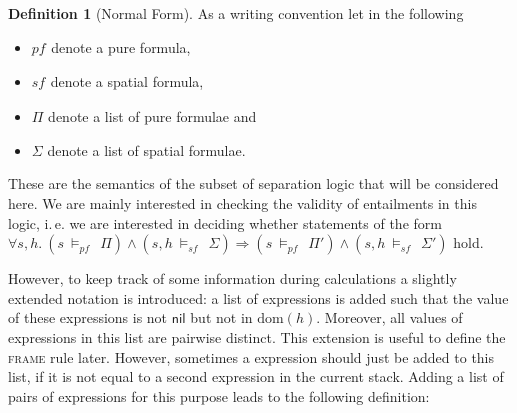 \documentclass{scrartcl}
\theoremstyle{definition}
\newtheorem{definition}{Definition}
\newcommand{\nil}{{\textsf{nil}}}
\newcommand{\modelspf}{{\models_{\textit{pf}}\ }}
\newcommand{\modelssf}{{\models_{\textit{sf}}\ }}
\newcommand{\varpf}[1]{\textit{pf}_{#1}}
\newcommand{\varsf}[1]{\textit{sf}_{#1}}
\newcommand{\dom}{{\text{dom}}}
\begin{document}
\begin{definition}[Normal Form]
\noindent
As a writing convention let in the following 
\begin{itemize}
  \item $\varpf {}$ denote a pure formula,
  \item $\varsf {}$ denote a spatial formula,
  \item $\Pi$ denote a list of pure formulae and
  \item $\Sigma$ denote a list of spatial formulae.
\end{itemize}
\end{definition}
\bigskip

These are the semantics of the subset of separation logic that will be
considered here. We are mainly interested in checking the validity of
entailments in this logic, i.\,e. we are interested in deciding whether
statements of the form $\forall s,h.\ \left(s\ \modelspf\ \Pi\right) \wedge
\left(s,h\ \modelssf\ \Sigma\right) \Rightarrow 
\left(s\ \modelspf\ \Pi'\right) \wedge \left(s,h\ \modelssf\ \Sigma'\right)$ hold.

However, to keep track of some information during calculations a slightly
extended notation is introduced: a list of expressions is added such that
the value of these expressions is not $\nil$ but not in $\dom(h)$. Moreover,
all values of expressions in this list are pairwise distinct. This extension is
useful to define the \textsc{frame} rule later. However, sometimes a
expression should just be added to this list, if it is not equal to a second
expression in the current stack. Adding a list of pairs of expressions
for this purpose leads to the following definition:
\end{document}
